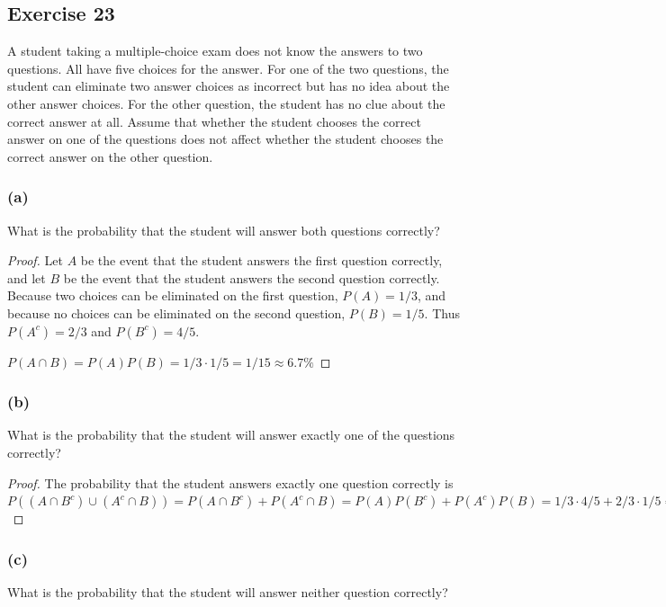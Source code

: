 \documentclass[14pt]{extarticle}
\begin{document}
\subsection{Exercise 23}
A student taking a multiple-choice exam does not know the answers to two questions. All have five choices for the 
answer. For one of the two questions, the student can eliminate two answer choices as incorrect but has no idea 
about the other answer choices. For the other question, the student has no clue about the correct answer at all. Assume 
that whether the student chooses the correct answer on one of the questions does not affect whether the student chooses the 
correct answer on the other question.

\subsubsection{(a)}
What is the probability that the student will answer both questions correctly?

\begin{proof}
Let \(A\) be the event that the student answers the first question correctly, and let \(B\) be the event that the 
student answers the second question correctly. Because two choices can be eliminated on the first question, 
\(P(A) = 1/3\), and because no choices can be eliminated on the second question, \(P(B) = 1/5\). Thus \(P(A^c) = 2/3\) and 
\(P(B^c) = 4/5\). 

\(P(A \cap B) = P(A)P(B) = 1/3 \cdot 1/5 = 1/15 \approx 6.7\%\)
\end{proof}

\subsubsection{(b)}
What is the probability that the student will answer exactly one of the questions correctly?

\begin{proof}
The probability that the student answers exactly one question correctly is \(P((A \cap B^c) \cup (A^c \cap B)) = P(A \cap 
B^c) + P(A^c \cap B) = P(A)P(B^c) + P(A^c)P(B) = 1/3 \cdot 4/5 + 2/3 \cdot 1/5 = 6/15 = 2/5 = 40\%\)
\end{proof}

\subsubsection{(c)}
What is the probability that the student will answer neither question correctly?
\end{document}

